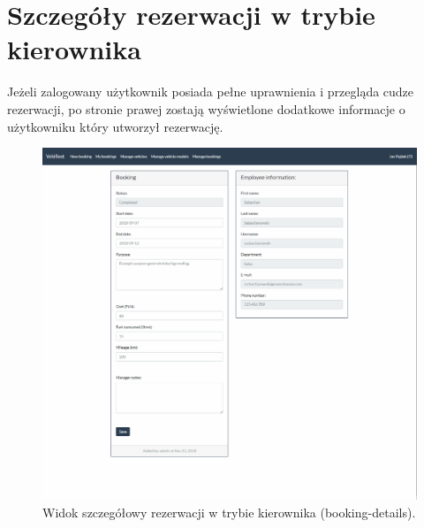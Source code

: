\documentclass[eng,printmode,openany]{mgr}
\begin{document}
	\newpage	
	\section{Szczegóły rezerwacji w trybie kierownika}
	Jeżeli zalogowany użytkownik posiada pełne uprawnienia i przegląda cudze rezerwacji, po stronie prawej zostają wyświetlone dodatkowe informacje o użytkowniku który utworzył rezerwację.
	\begin{figure}[H]
		\centering
		\includegraphics[width=\textwidth]{images/views/booking-detail-manager.png}
		\caption{Widok szczegółowy rezerwacji w trybie kierownika (booking-details).}		
	\end{figure}
	
	\newpage
\end{document}
